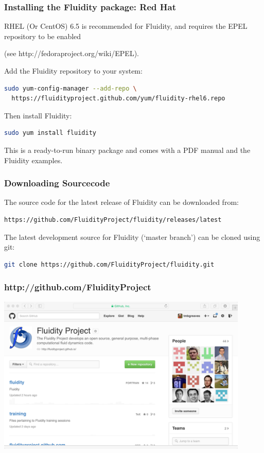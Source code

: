 \documentclass[12pt]{beamer}
\begin{document}
\begin{frame}[fragile]
        \frametitle{Installing the Fluidity package: Red Hat}
\lstset{language=bash}
RHEL (Or CentOS) 6.5 is recommended for Fluidity, and requires the EPEL
repository to be enabled 

\hspace{10mm}(see http://fedoraproject.org/wiki/EPEL). 

Add the Fluidity repository to your system:
\begin{lstlisting}[language=bash,basicstyle=\ttfamily\scriptsize]
sudo yum-config-manager --add-repo \
  https://fluidityproject.github.com/yum/fluidity-rhel6.repo
\end{lstlisting}
Then install Fluidity:
\begin{lstlisting}[language=bash,basicstyle=\ttfamily\scriptsize]
sudo yum install fluidity
\end{lstlisting}
This is a ready-to-run binary package and comes with a PDF manual and the
Fluidity examples.
\end{frame}

\begin{frame}[fragile]
        \frametitle{Downloading Sourcecode}
\lstset{language=bash}
The source code for the latest release of Fluidity can be downloaded from:
\begin{lstlisting}[language=bash,basicstyle=\ttfamily\scriptsize]
https://github.com/FluidityProject/fluidity/releases/latest
\end{lstlisting}    
The latest development source for Fluidity (`master branch') can be cloned using git:
\begin{lstlisting}[language=bash,basicstyle=\ttfamily\scriptsize]
git clone https://github.com/FluidityProject/fluidity.git
\end{lstlisting}    
\end{frame}

\begin{frame}
        \frametitle{http://github.com/FluidityProject}
\begin{center}
    \includegraphics[width=0.9\textwidth]{images/github-home.png}
\end{center}
\end{frame}
\end{document}
